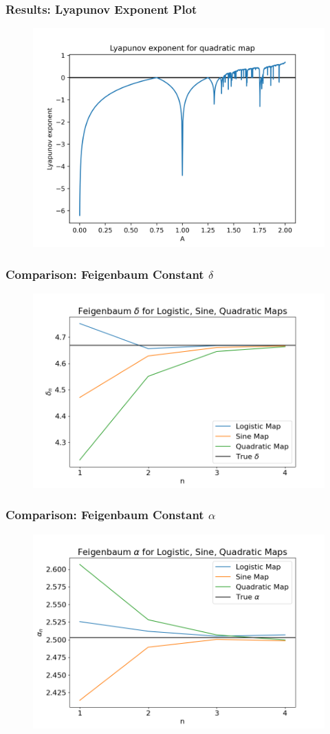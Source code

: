 \documentclass[
	11pt, %
	aspectratio=169, %
]{beamer}
\begin{document}

\begin{frame}
        \frametitle{Results: Lyapunov Exponent Plot}
        \begin{figure}
            \includegraphics[width=0.6\linewidth]
            {quadratic_lyapunov_exp.png}
        \end{figure}
\end{frame}


\begin{frame}
        \frametitle{Comparison: Feigenbaum Constant $\delta$}
        \begin{figure}
            \includegraphics[width=0.6\linewidth]
            {feigenbaum_deltas_first_three.png}
        \end{figure}
\end{frame}


\begin{frame}
        \frametitle{Comparison: Feigenbaum Constant $\alpha$}
        \begin{figure}
            \includegraphics[width=0.6\linewidth]
            {feigenbaum_alphas_first_three.png}
        \end{figure}
\end{frame}
\end{document}
